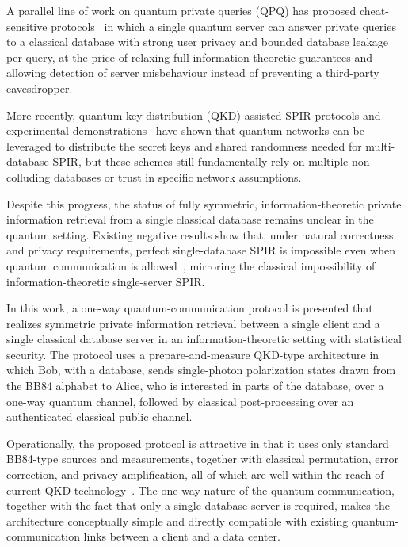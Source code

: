 \documentclass[%
 reprint,
superscriptaddress,
 amsmath,amssymb,
 aps,
]{revtex4-2}
\begin{document}
A parallel line of work on quantum private queries (QPQ) has proposed cheat-sensitive protocols~\cite{QPQ1, QPQ2, QPQ3} in which a single quantum server can answer private queries to a classical database with strong user privacy and bounded database leakage per query, at the price of relaxing full information-theoretic guarantees and allowing detection of server misbehaviour instead of preventing a third-party eavesdropper.

More recently, quantum-key-distribution (QKD)-assisted SPIR protocols and experimental demonstrations~\cite{QSPIR_multiple_database1, QSPIR_multiple_database2} have shown that quantum networks can be leveraged to distribute the secret keys and shared randomness needed for multi-database SPIR, but these schemes still fundamentally rely on multiple non-colluding databases or trust in specific network assumptions.

Despite this progress, the status of fully symmetric, information-theoretic private information retrieval from a single classical database remains unclear in the quantum setting. Existing negative results show that, under natural correctness and privacy requirements, perfect single-database SPIR is impossible even when quantum communication is allowed~\cite{Insecurity_Quantum_Oblivious_transfer1}, mirroring the classical impossibility of information-theoretic single-server SPIR.

In this work, a one-way quantum-communication protocol is presented that realizes symmetric private information retrieval between a single client and a single classical database server in an information-theoretic setting with statistical security.
The protocol uses a prepare-and-measure QKD-type architecture in which Bob, with a database, sends single-photon polarization states drawn from the BB84 alphabet to Alice, who is interested in parts of the database, over a one-way quantum channel, followed by classical post-processing over an authenticated classical public channel.

Operationally, the proposed protocol is attractive in that it uses only standard BB84-type sources and measurements, together with classical permutation, error correction, and privacy amplification, all of which are well within the reach of current QKD technology~\cite{Experimental_QKD1}. The one-way nature of the quantum communication, together with the fact that only a single database server is required, makes the architecture conceptually simple and directly compatible with existing quantum-communication links between a client and a data center.
\end{document}
